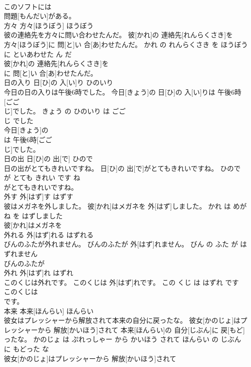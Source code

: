 \documentclass[8pt]{extreport}
\begin{document}
\begin{CJK}{UTF8}{min}
\\	このソフトには
\\	問題[もんだい]がある。			
\\	方々	方々[ほうぼう]	ほうぼう	
\\	彼の連絡先を方々に問い合わせたんだ。	彼[かれ]の 連絡先[れんらくさき]を 方々[ほうぼう]に 問[と]い 合[あ]わせたんだ。	かれ の れんらくさき を ほうぼう に といあわせた ん だ	
\\	彼[かれ]の 連絡先[れんらくさき]を
\\	に 問[と]い 合[あ]わせたんだ。			
\\	日の入り	日[ひ]の 入[い]り	ひのいり	
\\	今日の日の入りは午後6時でした。	今日[きょう]の 日[ひ]の 入[い]りは 午後6時[ごご 
\\	じ]でした。	きょう の ひのいり は ごご 
\\	じ でした	
\\	今日[きょう]の
\\	は 午後6時[ごご 
\\	じ]でした。			
\\	日の出	日[ひ]の 出[で]	ひので	
\\	日の出がとてもきれいですね。	日[ひ]の 出[で]がとてもきれいですね。	ひので が とても きれい です ね	
\\	がとてもきれいですね。			
\\	外す	外[はず]す	はずす	
\\	彼はメガネを外しました。	彼[かれ]はメガネを 外[はず]しました。	かれ は めがね を はずしました	
\\	彼[かれ]はメガネを
\\	外れる	外[はず]れる	はずれる	
\\	びんのふたが外れません。	びんのふたが 外[はず]れません。	びん の ふた が はずれません	
\\	びんのふたが
\\	外れ	外[はず]れ	はずれ	
\\	このくじは外れです。	このくじは 外[はず]れです。	この くじ は はずれ です	
\\	このくじは
\\	です。			
\\	本来	本来[ほんらい]	ほんらい	
\\	彼女はプレッシャーから解放されて本来の自分に戻ったな。	彼女[かのじょ]はプレッシャーから 解放[かいほう]されて 本来[ほんらい]の 自分[じぶん]に 戻[もど]ったな。	かのじょ は ぷれっしゃー から かいほう されて ほんらい の じぶん に もどった な	
\\	彼女[かのじょ]はプレッシャーから 解放[かいほう]されて

\end{CJK}
\end{document}
